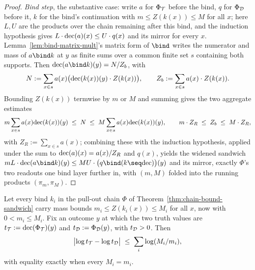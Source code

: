\begin{proof}
\emph{Bind step}, the substantive case: write $a$ for $\Phi_{\mathcal T}$
before the bind, $q$ for $\Phi_{\mathcal D}$ before it, $k$ for the bind's
continuation with $m \le Z(k(x)) \le M$ for all $x$; here $L,U$ are the
products over the chain remaining after this bind, and the induction
hypothesis gives $L \cdot \mathrm{dec}(a)(x) \le U \cdot q(x)$ and its mirror
for every $x$. Lemma~\ref{lem:bind-matrix-mult}'s matrix form of
$\bind$ writes the numerator and mass of $a \bind k$ at $y$ as finite
sums over a common finite set $s$ containing both supports. Then
$\dec(a\bind k)(y) = N/Z_b$, with
\[
  N := \sum_{x \in s} a(x)\bigl(\mathrm{dec}(k(x))(y) \cdot Z(k(x))\bigr),
  \qquad
  Z_b := \sum_{x \in s} a(x) \cdot Z(k(x)).
\]
Bounding $Z(k(x))$ termwise by $m$ or $M$ and summing gives the two
aggregate estimates
\[
  m \sum_{x \in s} a(x)\mathrm{dec}(k(x))(y) \;\le\; N \;\le\;
  M \sum_{x \in s} a(x)\mathrm{dec}(k(x))(y),
  \qquad
  m \cdot Z_R \;\le\; Z_b \;\le\; M \cdot Z_R,
\]
with $Z_R := \sum_{x\in s} a(x)$; combining these with the induction
hypothesis, applied under the sum to $\mathrm{dec}(a)(x) = a(x)/Z_R$ and
$q(x)$, yields the widened sandwich
$mL \cdot \dec(a \bind k)(y) \le MU \cdot \bigl(q \bind (k \seq \dec)\bigr)(y)$
and its mirror, exactly $\Phi$'s two readouts one bind layer further
in, with $(m,M)$ folded into the running products $(\pi_m,\pi_M)$.
\end{proof}

\begin{theorem}
\label{thm:chain-bound}
\leanok
Let every bind $k_i$ in the pull-out chain $\Phi$ of
Theorem~\ref{thm:chain-bound-sandwich} carry mass bounds $m_i \le
Z(k_i(x)) \le M_i$ for all $x$, now with $0 < m_i \le M_i$. Fix an
outcome $y$ at which the two truth values are
$t_{\mathcal T} := \mathrm{dec}(\Phi_{\mathcal T})(y)$ and $t_{\mathcal D} := \Phi_{\mathcal D}(y)$,
with $t_{\mathcal D} > 0$. Then
\[
  \bigl|\log t_{\mathcal T} - \log t_{\mathcal D}\bigr| \;\le\; \sum_i \log(M_i/m_i),
\]
with equality exactly when every $M_i = m_i$.
\end{theorem}


